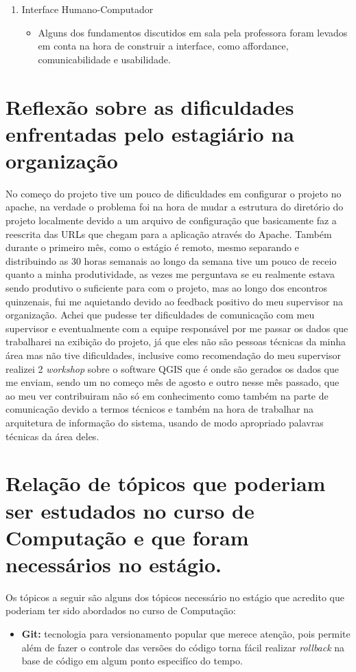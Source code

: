 \documentclass{ufscar}
\begin{document}
\begin{enumerate}
  \item Interface Humano-Computador
  \begin{itemize}
    \item Alguns dos fundamentos discutidos em sala pela professora foram levados em conta na hora de construir a interface, como affordance, comunicabilidade e usabilidade.
  \end{itemize}

\end{enumerate}

\section{Reflexão sobre as dificuldades enfrentadas pelo estagiário na organização}
No começo do projeto tive um pouco de dificuldades em configurar o projeto no apache, na verdade o problema foi na hora de mudar a estrutura do diretório do projeto localmente devido a um arquivo de configuração que basicamente faz a reescrita das URLs que chegam para a aplicação através do Apache. Também durante o primeiro mês, como o estágio é remoto, mesmo separando e distribuindo as 30 horas semanais ao longo da semana tive um pouco de receio quanto a minha produtividade, as vezes me perguntava se eu realmente estava sendo produtivo o suficiente para com o projeto, mas ao longo dos encontros quinzenais, fui me aquietando devido ao feedback positivo do meu supervisor na organização.
Achei que pudesse ter dificuldades de comunicação com meu supervisor e eventualmente com a equipe responsável por me passar os dados que trabalharei na exibição do projeto, já que eles não são pessoas técnicas da minha área mas não tive dificuldades, inclusive como recomendação do meu supervisor realizei 2 \textit{workshop} sobre o software QGIS que é onde são gerados os dados que me enviam, sendo um no começo mês de agosto e outro nesse mês passado, que ao meu ver contribuiram não só em conhecimento como também na parte de comunicação devido a termos técnicos e também na hora de trabalhar na arquitetura de informação do sistema, usando de modo apropriado palavras técnicas da área deles.

\section{Relação de tópicos que poderiam ser estudados no curso de Computação e que foram necessários no estágio.}
Os tópicos a seguir são alguns dos tópicos necessário no estágio que acredito que poderiam ter sido abordados no curso de Computação:
\begin{itemize}
  \item \textbf{Git:} tecnologia para versionamento popular que merece atenção, pois permite além de fazer o controle das versões do código torna fácil realizar \textit{rollback} na base de código em algum ponto especifíco do tempo.
\end{itemize}
\end{document}
